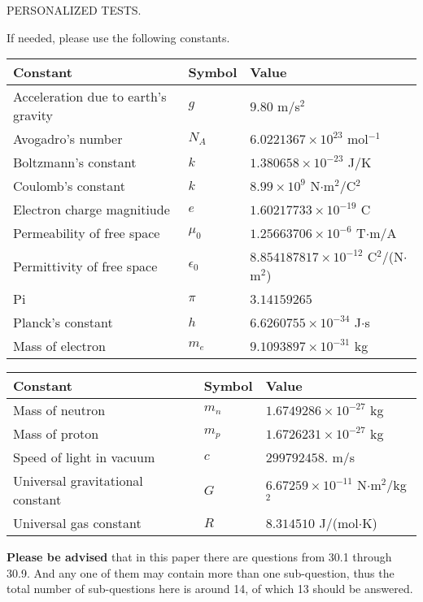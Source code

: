 \documentclass[12pt]{article}
\begin{document}
{\Huge  PERSONALIZED TESTS. }
 
If needed, please use the following constants.
 
 
 
\noindent\begin{tabular}{|l|l|l|}
\hline
Constant & Symbol & Value \\
\hline
Acceleration due to earth's gravity &
$g$ &
 $ 9.80 $
m/s$^2$ \\
\hline
Avogadro's number &
$N_A$ &
 $ 6.0221367 \times 10^{23} $
mol$^{-1}$ \\
\hline
Boltzmann's constant &
$k$ &
 $ 1.380658 \times 10^{-23} $
J/K \\
\hline
Coulomb's constant &
$k$ &
 $ 8.99 \times 10^{9} $
N$\cdot $m$^2$/C$^2$ \\
\hline
Electron charge magnitiude &
$e$ &
 $ 1.60217733 \times 10^{-19} $
C \\
\hline
Permeability of free space &
$\mu _0$ &
 $ 1.25663706 \times 10^{-6} $
T$\cdot $m/A \\
\hline
Permittivity of free space &
$\epsilon _0$ &
 $ 8.854187817 \times 10^{-12} $
C$^2$/(N$\cdot $m$^2$) \\
\hline
Pi &
$\pi$ &
 $ 3.14159265 $
$ $ \\
\hline
Planck's constant &
$h$ &
 $ 6.6260755 \times 10^{-34} $
J$\cdot $s \\
\hline
Mass of electron &
$m_e$ &
 $ 9.1093897 \times 10^{-31} $
kg \\
\hline
\end{tabular}
 
 
\noindent\begin{tabular}{|l|l|l|}
\hline
Constant & Symbol & Value \\
\hline
Mass of neutron &
$m_n$ &
 $ 1.6749286 \times 10^{-27} $
kg \\
\hline
Mass of proton &
$m_p$ &
 $ 1.6726231 \times 10^{-27} $
kg \\
\hline
Speed of light in vacuum &
$c$ &
 $ 299792458. $
m/s \\
\hline
Universal gravitational constant &
$G$ &
 $ 6.67259 \times 10^{-11} $
N$\cdot $m$^2$/kg$^2$ \\
\hline
Universal gas constant &
$R$ &
 $ 8.314510 $
J/(mol$\cdot $K) \\
\hline
\end{tabular}
 
 
{\textbf{\large{Please be advised}}} that in this paper there are questions from
30.1 through
30.9.
And any one of them may contain more than one sub-question, thus the total number
of sub-questions here is around 14, of which
13 should be answered.
 
\end{document}
